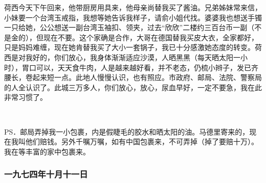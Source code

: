 \par 荷西今天下午回来，他带厨房用具来，他母亲尚替我买了酱油。兄弟姊妹常来信，小妹要一个台湾玉戒指，我想等她告诉我样子，请俞小姐代找。婆婆我也想送手镯一只给她，公公想送一副台湾玉袖扣、领夹，过去“欣欣”二楼约三百台币一副（不是金的），但现在不要。这个家确是合作，大哥在德国替我买皮大衣，全家都好，只是妈妈难缠，现在她肯替我买了大小一套锅子，我已十分感激她态度的转变。荷西是对我好的，你们放心，我身体渐渐适应沙漠，人晒黑黑（每天晒太阳一小时），胃口可以，天天食牛肉，人是越来越好看，并不老态，仍梳小辫子，发已齐腰长，卷起来短一点。此地人慢慢认识，也有照应。市政府、邮局、法院、警察局的人全认识了。此城三万多人，你们放心，放心，尿血早好，一定不要急，我在此非常习惯了。
\par {}
\par  
\par PS．邮局弄掉我一小包裹，内是假睫毛的胶水和晒太阳的油。马德里寄来的，现在我叫他们赔钱。另外千嘱万嘱，如有中国包裹来，不可弄掉（掉了要赔十万）。我在等丰富的家中包裹来。

\subsubsection{一九七四年十月十一日}

